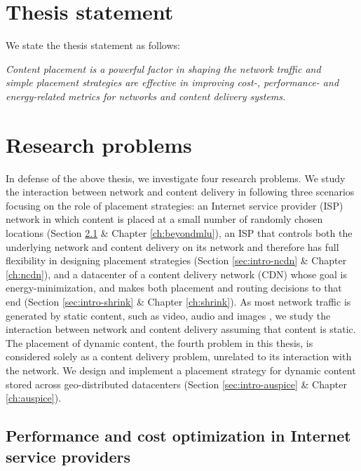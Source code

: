 \section{Thesis statement}
We state the thesis statement as follows: 
\begin{center}
\emph{Content placement is a powerful factor in shaping the network traffic and \\ simple placement strategies are effective in improving cost-, performance- and energy-related metrics for networks and content delivery systems.}
\end{center}

\section{Research problems}

In defense of the above thesis, we investigate four research problems. We study the interaction between network and content delivery in following three scenarios focusing on the role of placement strategies: an Internet service provider (ISP) network in which content is placed at a small number of randomly chosen locations (Section \ref{sec:intro-beyondmlu} \&  Chapter  \ref{ch:beyondmlu}), an ISP that controls both the underlying network and content delivery on its network and therefore has full flexibility in designing placement strategies  (Section \ref{sec:intro-ncdn} \&  Chapter  \ref{ch:ncdn}), and a datacenter of a content delivery network (CDN) whose goal is energy-minimization, and makes both placement and routing decisions to that end (Section \ref{sec:intro-shrink} \&  Chapter  \ref{ch:shrink}). As most network traffic is generated by static content, such as video, audio and images \cite{cisco-videogrowth}, we study the interaction between network and content delivery assuming that content is static. 
The placement of dynamic content, the fourth problem in this thesis, is considered solely as a content delivery problem, unrelated to its interaction with the  network. We  design and implement a  placement strategy for dynamic content stored across geo-distributed datacenters (Section \ref{sec:intro-auspice} \&  Chapter  \ref{ch:auspice}). 

\subsection{Performance and cost optimization in Internet service providers}
\label{sec:intro-beyondmlu}

